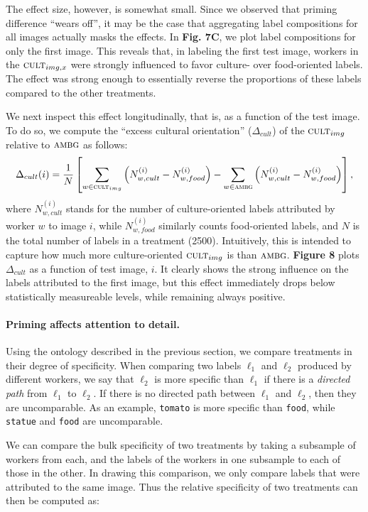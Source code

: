 \documentclass[a4paper]{report}
\begin{document}
The effect size, however, is somewhat small.  Since we observed that priming 
difference ``wears off'', it may be the case 
that aggregating label compositions for all images actually masks the effects. 
In \textbf{Fig. 7C}, we plot label compositions for only the first
image.  This reveals that, in labeling the first test image, workers in the
$\textsc{cult}_{img,x}$ were strongly influenced to favor culture- over 
food-oriented labels.  The effect was strong enough to essentially reverse 
the proportions of these labels compared to the other treatments.

We next inspect this effect longitudinally, that is, as a function of 
the test image.  To do so, we compute the ``excess cultural orientation'' 
($\Delta_{cult}$) of
the $\textsc{cult}_{img}$ relative to $\textsc{ambg}$ as follows: 
\begin{align}
	\Delta_{cult}(i) = \frac{1}{N}\left[ \sum_{w\in\textsc{cult}_{img}} \left(N_{w,cult}^{(i)} - N_{w,food}^{(i)}\right)
	- \sum_{w\in\textsc{ambg}} \left(N_{w,cult}^{(i)} - N_{w,food}^{(i)}\right)\right],
\end{align}
where $N_{w,cult}^{(i)}$ stands for the number of culture-oriented labels 
attributed by worker $w$ to image $i$, while $N_{w,food}^{(i)}$ similarly 
counts food-oriented labels, and $N$ is the total number of labels in a 
treatment (2500).  
Intuitively, this is intended to capture how much 
more culture-oriented $\textsc{cult}_{img}$ is than $\textsc{ambg}$.  
\textbf{Figure 8} plots $\Delta_{cult}$ as a function of test image, $i$. It
clearly shows the strong influence on the labels attributed to the first image,
but this effect immediately drops below statistically measureable levels, while
remaining always positive.

\paragraph{Priming affects attention to detail.} Using the ontology described
in the previous section, we compare treatments in their degree of specificity.
When comparing two labels $\ell_1$ and $\ell_2$ produced by different workers,
we say that $\ell_2$ is more specific than $\ell_1$ if there is a 
\textit{directed path} from $\ell_1$ to $\ell_2$.  If there is no directed path
between $\ell_1$ and $\ell_2$, then they are uncomparable.  As an example,
\texttt{tomato} is more specific than \texttt{food}, while \texttt{statue}
and \texttt{food} are uncomparable.

We can compare the bulk specificity of two treatments by taking a subsample
of workers from each, and the labels of the workers in one
subsample to each of those in the other.  In drawing this comparison, we only 
compare labels that were attributed to the same image.  Thus the relative 
specificity of two treatments can then be computed as:
\end{document}
